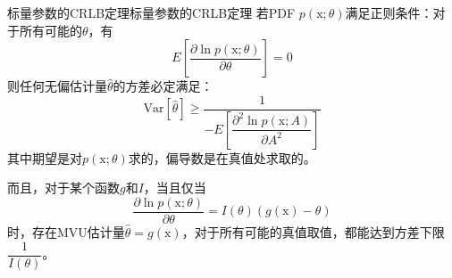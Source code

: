         \begin{theorem}{标量参数的CRLB定理}{标量参数的CRLB定理}
            若PDF $p(\bm{\mathrm{x}};\theta)$满足正则条件：对于所有可能的$\theta$，有
            \begin{equation}
                E\left[\frac{\partial \ln p(\bm{\mathrm{x}};\theta)}{\partial \theta}\right]=0
            \end{equation}
            则任何无偏估计量$\hat{\theta}$的方差必定满足：
            \begin{equation}
                \mathrm{Var}\left[\hat{\theta}\right]
                \geqslant
                \dfrac{1}{-E\left[\dfrac{\partial^2\ln p(\bm{\mathrm{x}};A)}{\partial A^2}\right]}
            \end{equation}
            其中期望是对$p(\bm{\mathrm{x}};\theta)$求的，偏导数是在真值处求取的。

            而且，对于某个函数$g$和$I$，当且仅当
            \begin{equation}
                \frac{\partial \ln p(\bm{\mathrm{x}};\theta)}{\partial \theta}=I(\theta)(g(\bm{\mathrm{x}})-\theta)
            \end{equation}
            时，存在MVU估计量$\hat{\theta}=g(\bm{\mathrm{x}})$，对于所有可能的真值取值，都能达到方差下限$\dfrac{1}{I(\theta)}$。
        \end{theorem}